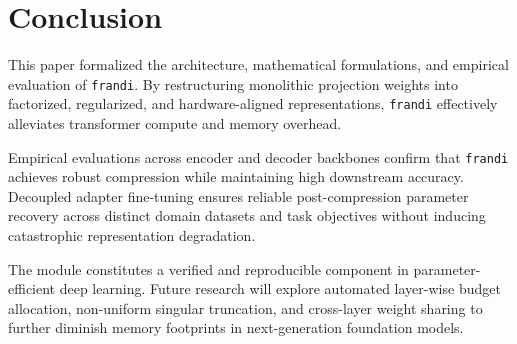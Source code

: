 \section{Conclusion}
This paper formalized the architecture, mathematical formulations, and empirical evaluation of \texttt{frandi}. By restructuring monolithic projection weights into factorized, regularized, and hardware-aligned representations, \texttt{frandi} effectively alleviates transformer compute and memory overhead.

Empirical evaluations across encoder and decoder backbones confirm that \texttt{frandi} achieves robust compression while maintaining high downstream accuracy. Decoupled adapter fine-tuning ensures reliable post-compression parameter recovery across distinct domain datasets and task objectives without inducing catastrophic representation degradation.

The module constitutes a verified and reproducible component in parameter-efficient deep learning. Future research will explore automated layer-wise budget allocation, non-uniform singular truncation, and cross-layer weight sharing to further diminish memory footprints in next-generation foundation models.
